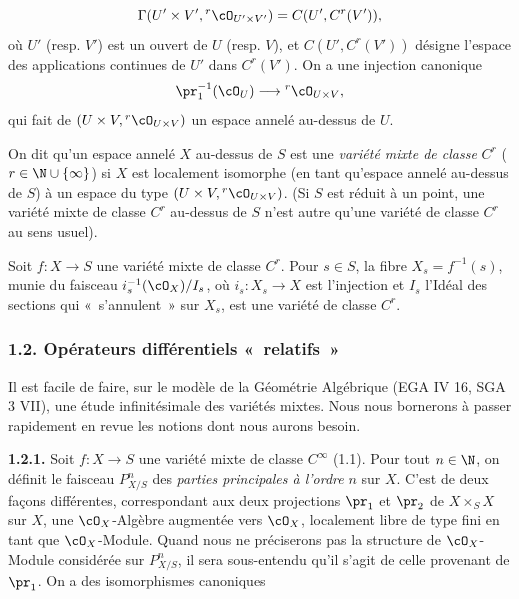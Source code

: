 \[
  \Gamma(U'\times V',{}^r\cO_{U'\times V'})=C(U',C^r(V')),
\]
où $U'$ (resp. $V'$) est un ouvert de $U$ (resp. $V$), et $C(U',C^r(V'))$ désigne l'espace des applications continues de $U'$ dans $C^r(V')$. On a une injection canonique
\[
  \pr_1^{-1}(\cO_U)\longrightarrow{}^r\cO_{U\times V},
\]
qui fait de $(U\times V,{}^r\cO_{U\times V})$ un espace annelé au-dessus de $U$.

On dit qu'un espace annelé $X$ au-dessus de $S$ est une \emph{variété mixte de classe} $C^r$ ($r\in\N\cup\{\infty\}$) si $X$ est localement isomorphe (en tant qu'espace annelé au-dessus de $S$) à un espace du type $(U\times V,{}^r\cO_{U\times V})$. (Si $S$ est réduit à un point, une variété mixte de classe $C^r$ au-dessus de $S$ n'est autre qu'une variété de classe $C^r$ au sens usuel).

Soit $f:X\to S$ une variété mixte de classe $C^r$. Pour $s\in S$, la fibre $X_s=f^{-1}(s)$, munie du faisceau $i_s^{-1}(\cO_X)/I_s$, où $i_s:X_s\to X$ est l'injection et $I_s$ l'Idéal des sections qui «~s'annulent~» sur $X_s$, est une variété de classe $C^r$.

\subsubsection*{1.2. Opérateurs différentiels «~relatifs~»}
Il est facile de faire, sur le modèle de la Géométrie Algébrique (EGA IV 16, SGA 3 VII), une étude infinitésimale des variétés mixtes. Nous nous bornerons à passer rapidement en revue les notions dont nous aurons besoin.

\textbf{1.2.1.} Soit $f:X\to S$ une variété mixte de classe $C^\infty$ (1.1). Pour tout $n\in\N$, on définit le faisceau $P^n_{X/S}$ des \emph{parties principales à l'ordre} $n$ sur $X$. C'est de deux façons différentes, correspondant aux deux projections $\pr_1$ et $\pr_2$ de $X\times_S X$ sur $X$, une $\cO_X$-Algèbre augmentée vers $\cO_X$, localement libre de type fini en tant que $\cO_X$-Module. Quand nous ne préciserons pas la structure de $\cO_X$-Module considérée sur $P^n_{X/S}$, il sera sous-entendu qu'il s'agit de celle provenant de $\pr_1$. On a des isomorphismes canoniques
